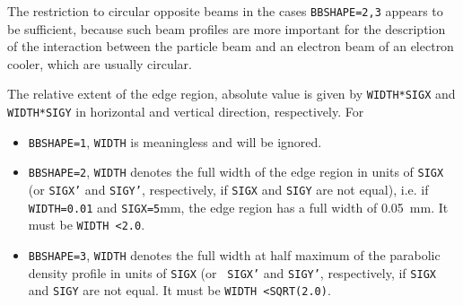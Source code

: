 {\begin{madlist}
\begin{itemize}
     \end{itemize}
     
     The restriction to circular opposite beams in the cases {\tt BBSHAPE=2,3}
     appears to be sufficient, because such beam profiles are more important 
     for the description of the interaction between the particle beam and 
     an electron beam of an electron cooler, which are usually circular. 
     
    The relative extent of the edge region, absolute value is 
   given by {\tt WIDTH*SIGX} and {\tt WIDTH*SIGY} in horizontal and vertical 
   direction, respectively. 
     For 
     \begin{itemize}
       \item  {\tt BBSHAPE=1}, {\tt WIDTH} is meaningless and will be ignored.
       \item  {\tt BBSHAPE=2}, {\tt WIDTH} denotes the full width of the edge 
       region in units of {\tt SIGX} (or {\tt SIGX'} and {\tt SIGY'}, 
       respectively, if {\tt SIGX} and {\tt SIGY} are not equal), i.e. 
       if {\tt WIDTH=0.01} and {\tt SIGX=5}mm, the edge  region has a full 
       width of 0.05\ mm. It must be {\tt WIDTH \textless 2.0}.
       \item  {\tt BBSHAPE=3}, {\tt WIDTH} denotes the full width at half 
       maximum of the parabolic density profile in units of {\tt SIGX} (or {\tt 
       SIGX'} and {\tt SIGY'}, respectively, if {\tt SIGX} and {\tt SIGY} are 
       not equal. It must be {\tt WIDTH \textless SQRT(2.0)}.
     \end{itemize} 


\end{madlist}}
